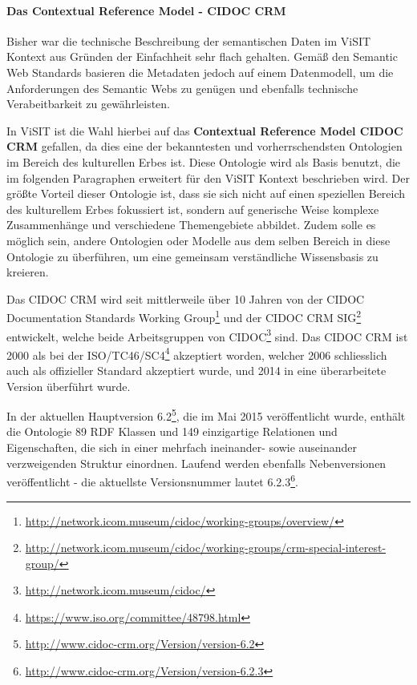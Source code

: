 \paragraph{Das Contextual Reference Model - CIDOC CRM}

Bisher war die technische Beschreibung der semantischen Daten im ViSIT Kontext aus Gründen der Einfachheit sehr flach gehalten. Gemäß den Semantic Web Standards basieren die Metadaten jedoch auf einem Datenmodell, um die Anforderungen des Semantic Webs zu genügen und ebenfalls technische Verabeitbarkeit zu gewährleisten.

In ViSIT ist die Wahl hierbei auf das \textbf{Contextual Reference Model CIDOC CRM} \cite{CIDOC-Doerr-2003} gefallen, da dies eine der bekanntesten und vorherrschendsten Ontologien im Bereich des kulturellen Erbes ist. Diese Ontologie wird als Basis benutzt, die im folgenden Paragraphen erweitert für den ViSIT Kontext beschrieben wird. Der größte Vorteil dieser Ontologie ist, dass sie sich nicht auf einen speziellen Bereich des kulturellem Erbes fokussiert ist, sondern auf generische Weise komplexe Zusammenhänge und verschiedene Themengebiete abbildet. Zudem solle es möglich sein, andere Ontologien oder Modelle aus dem selben Bereich in diese Ontologie zu überführen, um eine gemeinsam verständliche Wissensbasis zu kreieren.

Das CIDOC CRM wird seit mittlerweile über 10 Jahren von der CIDOC Documentation Standards Working Group\footnote{\url{http://network.icom.museum/cidoc/working-groups/overview/}} und der CIDOC CRM SIG\footnote{\url{http://network.icom.museum/cidoc/working-groups/crm-special-interest-group/}} entwickelt, welche beide Arbeitsgruppen von CIDOC\footnote{\url{http://network.icom.museum/cidoc/}} sind. Das CIDOC CRM ist 2000 als  bei der ISO/TC46/SC4\footnote{\url{https://www.iso.org/committee/48798.html}} akzeptiert worden, welcher 2006 schliesslich auch als offizieller Standard \cite{CIDOCCRM-iso21127:2006} akzeptiert wurde, und 2014 in eine überarbeitete Version \cite{CIDOCCRM-iso21127:2014} überführt wurde.

In der aktuellen Hauptversion 6.2\footnote{\url{http://www.cidoc-crm.org/Version/version-6.2}}, die im Mai 2015 veröffentlicht wurde, enthält die Ontologie 89 RDF Klassen und 149 einzigartige Relationen und Eigenschaften, die sich in einer mehrfach ineinander- sowie auseinander verzweigenden Struktur einordnen. Laufend werden ebenfalls Nebenversionen veröffentlicht - die aktuellste Versionsnummer lautet 6.2.3\footnote{\url{http://www.cidoc-crm.org/Version/version-6.2.3}}.

